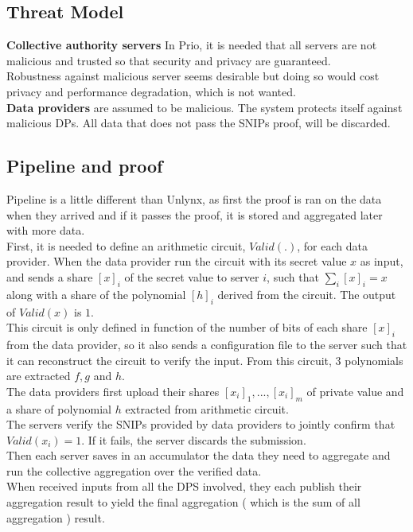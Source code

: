 \documentclass{article}
\begin{document}
\subsection{Threat Model}
\textbf{Collective authority servers} In Prio, it is needed that all servers are not malicious and trusted so that security and privacy are guaranteed.\\
Robustness against malicious server seems desirable but doing so would cost privacy and performance degradation, which is not wanted.\\
\textbf{Data providers} are assumed to be malicious. The system protects itself against malicious DPs. All data that does not pass the SNIPs proof, will be discarded.\\

\subsection{Pipeline and proof}
Pipeline is a little different than Unlynx, as first the proof is ran on the data when they arrived and if it passes the proof, it is stored and aggregated later with more data.\\
First, it is needed to define an arithmetic circuit, $Valid(.)$, for each data provider.
When the data provider run the circuit with its secret value $x$ as input, and sends a share $[x]_i$ of the secret value to server $i$, such that $\sum_{i}{[x]_i} = x $ along with a share of the polynomial $[h]_i$ derived from the circuit. The output of $Valid(x)$ is $1$.\\ 
This circuit is only defined in function of the number of bits of each share $[x]_i$ from the data provider, so it also sends a configuration file to the server such that it can reconstruct the circuit to verify the input. From this circuit, $3$ polynomials are extracted $f,g $ and $h$.\\

The data providers first upload their shares $[x_i]_1,...,[x_i]_m$ of private value and a share of polynomial $h$ extracted from arithmetic circuit.\\
The servers verify the SNIPs provided by data providers to jointly confirm that $Valid(x_i) = 1$. If it fails, the server discards the submission.\\
Then each server saves in an accumulator the data they need to aggregate and run the collective aggregation over the verified data.\\
When received inputs from all the DPS involved, they each publish their aggregation result to yield the final aggregation ( which is the sum of all aggregation ) result.
\end{document}
